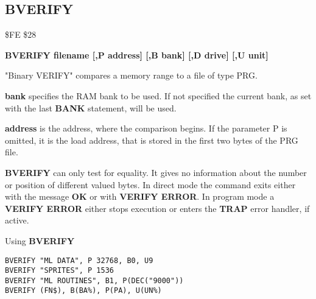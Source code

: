 
\newpage
\subsection{BVERIFY}
\begin{description}[leftmargin=2cm,style=nextline]
\item [Token:] \$FE \$28
\item [Format:] {\bf BVERIFY filename [,P address]
                [,B bank] [,D drive] [,U unit] }
\item [Usage:]
   "Binary VERIFY" compares a memory range to
   a file of type PRG.

   \filenamedefinition

   {\bf bank} specifies the RAM bank to be used.
   If not specified the current bank, as set with the last
   {\bf BANK} statement, will be used.

   {\bf address} is the address, where the comparison begins.
   If the parameter P is omitted, it is the load address,
   that is stored in the first two bytes of the PRG file.

   \drivedefinition

   \unitdefinition

\item [Remarks:]
   {\bf BVERIFY} can only test for equality. It gives no information
   about the number or position of different valued bytes.
   In direct mode the command exits either with the message {\bf OK}
   or with {\bf VERIFY ERROR}. In program mode a {\bf VERIFY ERROR}
   either stops execution or enters the {\bf TRAP} error handler,
   if active.

\item [Example:] Using {\bf BVERIFY}
\begin{tcolorbox}[colback=black,coltext=white]
\verbatimfont{\codefont}
\begin{verbatim}
BVERIFY "ML DATA", P 32768, B0, U9
BVERIFY "SPRITES", P 1536
BVERIFY "ML ROUTINES", B1, P(DEC("9000"))
BVERIFY (FN$), B(BA%
\end{verbatim}
\end{tcolorbox}
\end{description}


\newpage
